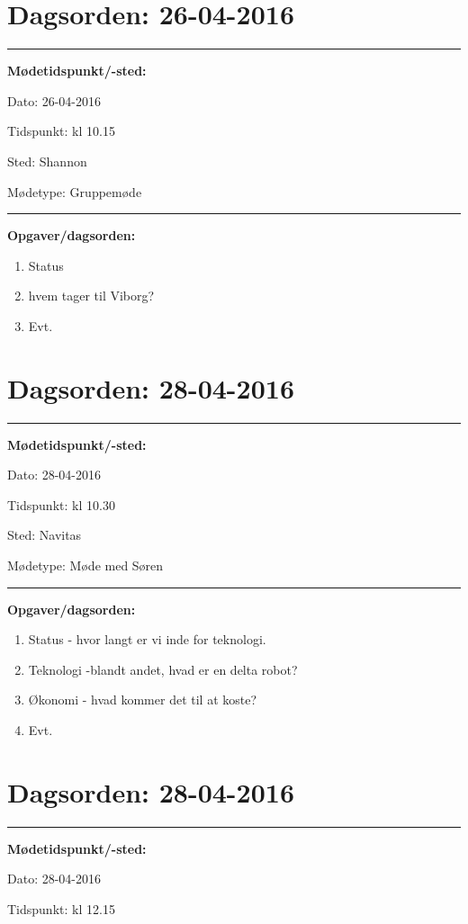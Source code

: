 \section{Dagsorden: 26-04-2016 }
\hrule
\textbf{Mødetidspunkt/-sted:} 

Dato: \tabto{7em} 26-04-2016

Tidspunkt: \tabto{7em} kl 10.15

Sted: \tabto{7em} Shannon 

Mødetype: \tabto{7em} Gruppemøde \newline


\hrule
\textbf{Opgaver/dagsorden:} \newline
\begin{enumerate}
	\item Status
	\item hvem tager til Viborg? 
	\item Evt. 
\end{enumerate} 

\newpage 
\section{Dagsorden: 28-04-2016 }
\hrule
\textbf{Mødetidspunkt/-sted:} 

Dato: \tabto{7em} 28-04-2016

Tidspunkt: \tabto{7em} kl 10.30

Sted: \tabto{7em} Navitas

Mødetype: \tabto{7em} Møde med Søren \newline


\hrule
\textbf{Opgaver/dagsorden:} \newline
\begin{enumerate}
	\item Status - hvor langt er vi inde for teknologi. 
	\item Teknologi -blandt andet, hvad er en delta robot? 
	\item Økonomi - hvad kommer det til at koste?  
	\item Evt. 
\end{enumerate} 

\section{Dagsorden: 28-04-2016 }
\hrule
\textbf{Mødetidspunkt/-sted:} 

Dato: \tabto{7em} 28-04-2016

Tidspunkt: \tabto{7em} kl 12.15

